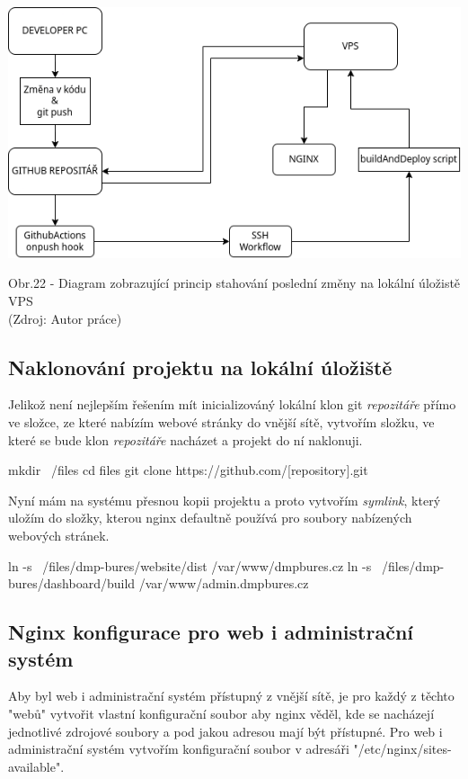 \documentclass[12pt,a4paper]{report}
\begin{document}
  \vspace*{0.5cm}
  \noindent\includegraphics[width=\linewidth]{CIDC_visualization.png}
  \begin{center}
    Obr.22 - Diagram zobrazující princip stahování poslední změny na lokální úložistě VPS \\
    (Zdroj: Autor práce)
  \end{center}
  \vspace*{0.5cm}

  \subsection{Naklonování projektu na lokální úložiště}
  Jelikož není nejlepším řešením mít inicializováný lokální klon git \emph{repozitáře} přímo ve složce, ze které 
  nabízím webové stránky do vnější sítě, vytvořím složku, ve které se bude klon \emph{repozitáře} nacházet a projekt do ní naklonuji.
  \begin{bash}
    mkdir ~/files
    cd files
    git clone https://github.com/[repository].git 
  \end{bash}
  
  Nyní mám na systému přesnou kopii projektu a proto vytvořím \emph{symlink}, který uložím do složky,
  kterou nginx defaultně používá pro soubory nabízených webových stránek.

  \begin{bash}
    ln -s ~/files/dmp-bures/website/dist /var/www/dmpbures.cz
    ln -s ~/files/dmp-bures/dashboard/build /var/www/admin.dmpbures.cz
  \end{bash}

  \subsection{Nginx konfigurace pro web i administrační systém}
  Aby byl web i administrační systém přístupný z vnější sítě, je pro každý z těchto "webů"  vytvořit 
  vlastní konfigurační soubor aby nginx věděl, kde se nacházejí jednotlivé zdrojové soubory a 
  pod jakou adresou mají být přístupné.
  Pro web i administrační systém vytvořím konfigurační soubor v adresáři "/etc/nginx/sites-available".
  
\end{document}
